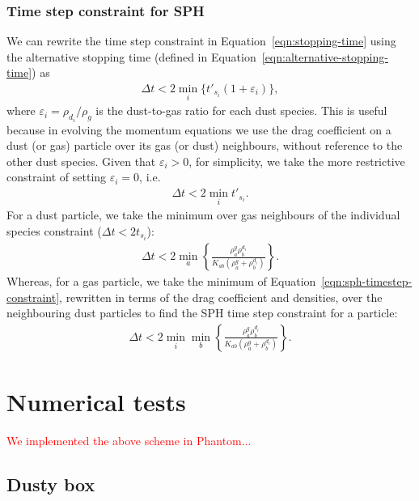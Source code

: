 \documentclass[fleqn,usenatbib]{mnras}
\begin{document}
\subsubsection{Time step constraint for SPH}

We can rewrite the time step constraint in Equation~\ref{eqn:stopping-time}
using the alternative stopping time
(defined in Equation~\ref{eqn:alternative-stopping-time}) as
%
\begin{align}
   \Delta t < 2 \min_i \{t'_{s_i} (1 + \varepsilon_i)\},
\end{align}
%
where \(\varepsilon_i = \rho_{d_i} / \rho_g\) is the dust-to-gas ratio for each
dust species. This is useful because in evolving the momentum equations we use
the drag coefficient on a dust (or gas) particle over its gas (or dust)
neighbours, without reference to the other dust species. Given that
\(\varepsilon_i > 0\), for simplicity, we take the more restrictive constraint of
setting \(\varepsilon_i = 0\), i.e.
%
\begin{align}
   \label{eqn:sph-timestep-constraint}
   \Delta t < 2 \min_i t'_{s_i}.
\end{align}
%
For a dust particle, we take the minimum over gas neighbours of the individual
species constraint (\(\Delta t < 2 t_{s_i}\)):
%
\begin{align}
   \Delta t < 2 \min_{a}
   \left\{ \frac{\rho^g_a \rho^{d_i}_b}{K_{ab} (\rho^g_a + \rho^{d_i}_b)} \right\}.
\end{align}
%
Whereas, for a gas particle, we take the minimum of
Equation~\ref{eqn:sph-timestep-constraint}, rewritten in terms of the drag
coefficient and densities, over the neighbouring dust particles to find the SPH
time step constraint for a particle:
%
\begin{align}
   \Delta t < 2 \min_i \min_{b}
   \left\{ \frac{\rho^g_a \rho^{d_i}_b}{K_{ab} (\rho^g_a + \rho^{d_i}_b)} \right\}.
\end{align}
%

\section{Numerical tests}

\textcolor{red}{We implemented the above scheme in Phantom...}

\subsection{Dusty box}
\end{document}
